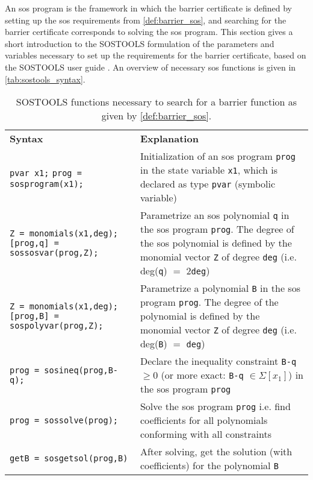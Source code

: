 An \gls{sos} program is the framework in which the barrier certificate is defined by setting up the  \gls{sos} requirements from \autoref{def:barrier_sos}, and searching for the barrier certificate corresponds to solving the \gls{sos} program.
This section gives a short introduction to the SOSTOOLS formulation of the parameters and variables necessary to set up the requirements for the barrier certificate, based on the SOSTOOLS user guide \citep{bib:sostools_manual}.  
An overview of necessary \gls{sos} functions is given in \autoref{tab:sostools_syntax}.
\vspace{2mm}
\begin{table}[htbp]
	\begin{tabularx}{\textwidth}{p{6cm} X}
		\rowcolor{HeaderBlue}
		\textbf{Syntax} & \textbf{Explanation}\\
		\texttt{pvar x1;}\newline
		\texttt{prog = sosprogram(x1);} & Initialization of an \gls{sos} program \texttt{prog} in the state variable \texttt{x1}, which is declared as  type \texttt{pvar} (symbolic variable)\\
		\rowcolor{textBlue} 
		\texttt{Z = monomials(x1,deg);}\newline
		\texttt{[prog,q] = sossosvar(prog,Z);} & Parametrize an \gls{sos} polynomial \texttt{q} in the \gls{sos} program \texttt{prog}. The degree of the \gls{sos} polynomial is defined by the monomial vector \texttt{Z} of degree \texttt{deg} (i.e. deg(\texttt{q}) $=$ 2\texttt{deg})\\
		\texttt{Z = monomials(x1,deg);}\newline
		\texttt{[prog,B] = sospolyvar(prog,Z);} & Parametrize a polynomial \texttt{B} in the \gls{sos} program \texttt{prog}. The degree of the  polynomial is defined by the monomial vector \texttt{Z} of degree \texttt{deg} (i.e. deg(\texttt{B}) $=$ \texttt{deg})\\
		\rowcolor{textBlue}
		\texttt{prog = sosineq(prog,B-q);} & Declare the inequality constraint \texttt{B-q} $\geq 0$ (or more exact: \texttt{B-q} $\in\Sigma[x_1]$) in the \gls{sos} program \texttt{prog}\\
		\texttt{prog = sossolve(prog);} & Solve the \gls{sos} program \texttt{prog} i.e. find coefficients for all polynomials conforming with all constraints \\
		\rowcolor{textBlue}
		\texttt{getB = sosgetsol(prog,B)} & After solving, get the solution (with coefficients) for the polynomial \texttt{B}
	\end{tabularx}
	\caption{SOSTOOLS functions necessary to search for a barrier function as given by \autoref{def:barrier_sos}.}
	\label{tab:sostools_syntax}
\end{table}




